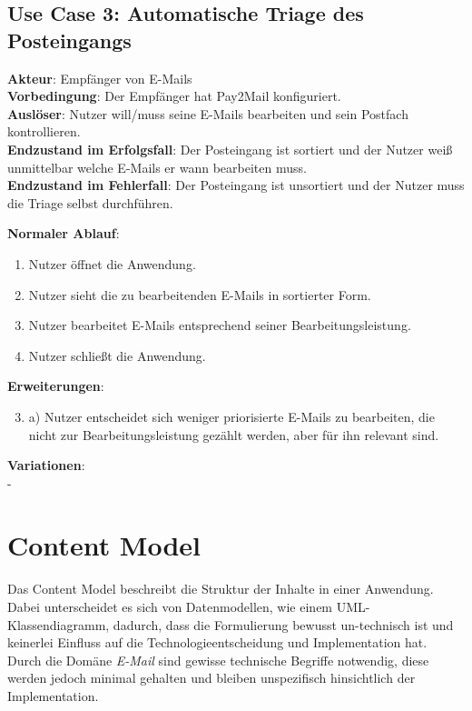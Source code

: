 \subsection*{Use Case 3: Automatische Triage des Posteingangs}
\textbf{Akteur}: Empfänger von E-Mails \\
\textbf{Vorbedingung}: Der Empfänger hat Pay2Mail konfiguriert. \\
\textbf{Auslöser}: Nutzer will/muss seine E-Mails bearbeiten und sein Postfach kontrollieren. \\
\textbf{Endzustand im Erfolgsfall}: Der Posteingang ist sortiert und der Nutzer weiß unmittelbar welche E-Mails er wann bearbeiten muss. \\
\textbf{Endzustand im Fehlerfall}: Der Posteingang ist unsortiert und der Nutzer muss die Triage selbst durchführen. 

\newpage

\noindent \textbf{Normaler Ablauf}:
\begin{enumerate}
    \item Nutzer öffnet die Anwendung.
    \item Nutzer sieht die zu bearbeitenden E-Mails in sortierter Form.
    \item Nutzer bearbeitet E-Mails entsprechend seiner Bearbeitungsleistung.
    \item Nutzer schließt die Anwendung.
\end{enumerate}

\noindent \textbf{Erweiterungen}:
\begin{enumerate}
\setcounter{enumi}{2}
    \item a) Nutzer entscheidet sich weniger priorisierte E-Mails zu bearbeiten, die nicht zur Bearbeitungsleistung gezählt werden, aber für ihn relevant sind.
\end{enumerate}

\noindent \textbf{Variationen}: \\
-


\section{Content Model}
\label{Content_Model}
Das Content Model beschreibt die Struktur der Inhalte in einer Anwendung. Dabei unterscheidet es sich von Datenmodellen, wie einem UML-Klassendiagramm, dadurch, dass die Formulierung bewusst un-technisch ist und keinerlei Einfluss auf die Technologieentscheidung und Implementation hat. Durch die Domäne \textit{E-Mail} sind gewisse technische Begriffe notwendig, diese werden jedoch minimal gehalten und bleiben unspezifisch hinsichtlich der Implementation. 


